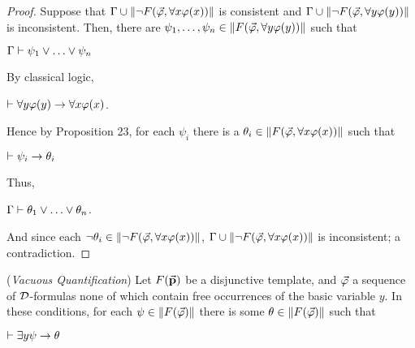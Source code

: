 \begin{proof} Suppose that $\Gamma \cup \Arrowvert \neg F(\vec{\varphi},\forall x\varphi(x)) \Arrowvert$ is consistent and  $\Gamma \cup \Arrowvert \neg F(\vec{\varphi},\forall y\varphi(y)) \Arrowvert$ is inconsistent. Then, there are $\psi_{1}, \dots, \psi_{n} \in \Arrowvert F(\vec{\varphi},\forall y\varphi(y)) \Arrowvert$ such that
	
	
	
	\begin{center}
		$\Gamma \teo \psi_{1} \ou \dots \ou \psi_{n}$
	\end{center} 
By classical logic,
	
	
	\begin{center}
		$\vdash \forall y\varphi(y) \rightarrow \forall x\varphi(x) $.
	\end{center} 
	
	
	\qquad Hence by Proposition 23, for each $\psi_{i}$ there is a $\theta_{i} \in  \Arrowvert F(\vec{\varphi},\forall x\varphi(x)) \Arrowvert$
	such that     
	
	\begin{center}
		$\vdash \psi_{i} \rightarrow \theta_{i}$
	\end{center} 
Thus,
	
	\begin{center}
		$\Gamma \teo \theta_{1} \ou \dots \ou \theta_{n}$.
	\end{center} 
	
	\qquad And since each $\neg \theta_{i} \in  \Arrowvert \neg F(\vec{\varphi},\forall x\varphi(x)) \Arrowvert$, $\Gamma \cup \Arrowvert \neg F(\vec{\varphi},\forall x\varphi(x)) \Arrowvert$ is inconsistent; a contradiction.
\end{proof}

\begin{pro}(\textit{Vacuous Quantification})
	Let $F(\vec{\textbf{p}})$ be a disjunctive template, and $\vec{\varphi}$ a sequence of $\mathcal{D}$-formulas none of which contain free occurrences of the basic variable $y$. In these conditions, for each $\psi \in \Arrowvert F(\vec{\varphi}) \Arrowvert$ there is some $\theta \in \Arrowvert F(\vec{\varphi}) \Arrowvert$ such that
	
	
	\begin{center}
		$\vdash \exists y\psi \rightarrow \theta$
	\end{center}    
\end{pro}

